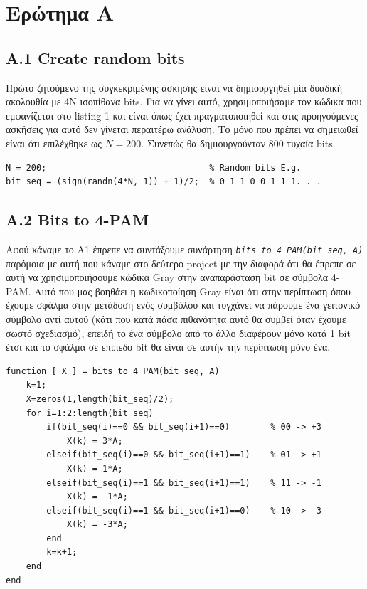 \documentclass[11pt]{article}
\begin{document}
    \section*{Ερώτημα Α} 
    
    \subsection*{A.1 Create random bits}
    Πρώτο ζητούμενο της συγκεκριμένης άσκησης είναι να δημιουργηθεί μία δυαδική ακολουθία με 4Ν ισοπίθανα bits. 
    Για να γίνει αυτό, χρησιμοποιήσαμε τον κώδικα που εμφανίζεται στο listing 1 και είναι όπως έχει πραγματοποιηθεί και στις προηγούμενες ασκήσεις για αυτό δεν γίνεται περαιτέρω ανάλυση. 
    Το μόνο που πρέπει να σημειωθεί είναι ότι επιλέχθηκε ως $Ν=200$. 
    Συνεπώς θα δημιουργούνταν 800 τυχαία bits.
    
   \begin{lstlisting}[caption = {A.1 Create random bits}]
% A.1
N = 200;                                % Random bits E.g. 
bit_seq = (sign(randn(4*N, 1)) + 1)/2;  % 0 1 1 0 0 1 1 1. . .
    \end{lstlisting}
    
    \subsection*{A.2 Bits to 4-PAM} 
    Αφού κάναμε το Α1 έπρεπε να συντάξουμε συνάρτηση \emph{\texttt{bits\_to\_4\_PAM(bit\_seq, A)}} παρόμοια με αυτή που κάναμε στο δεύτερο project με την διαφορά ότι θα έπρεπε σε αυτή να χρησιμοποιήσουμε κώδικα Gray στην αναπαράσταση bit σε σύμβολα 4-PAM. 
    Αυτό που μας βοηθάει η κωδικοποίηση Gray είναι ότι στην περίπτωση όπου έχουμε σφάλμα στην μετάδοση ενός συμβόλου και τυγχάνει να πάρουμε ένα γειτονικό σύμβολο αντί αυτού (κάτι που κατά πάσα πιθανότητα αυτό θα συμβεί όταν έχουμε σωστό σχεδιασμό), επειδή το ένα σύμβολο από το άλλο διαφέρουν μόνο κατά 1 bit έτσι και το σφάλμα σε επίπεδο bit θα είναι σε αυτήν την περίπτωση μόνο ένα.

    \newpage
    
    \begin{lstlisting}[caption = {A.2 \texttt{bits\_to\_4\_PAM(bit\_seq, A)}}]
function [ X ] = bits_to_4_PAM(bit_seq, A)
    k=1;
    X=zeros(1,length(bit_seq)/2);
    for i=1:2:length(bit_seq)
        if(bit_seq(i)==0 && bit_seq(i+1)==0)        % 00 -> +3
            X(k) = 3*A;
        elseif(bit_seq(i)==0 && bit_seq(i+1)==1)    % 01 -> +1
            X(k) = 1*A;
        elseif(bit_seq(i)==1 && bit_seq(i+1)==1)    % 11 -> -1
            X(k) = -1*A;
        elseif(bit_seq(i)==1 && bit_seq(i+1)==0)    % 10 -> -3
            X(k) = -3*A;
        end
        k=k+1;
    end
end
    \end{lstlisting}
    
\end{document}
